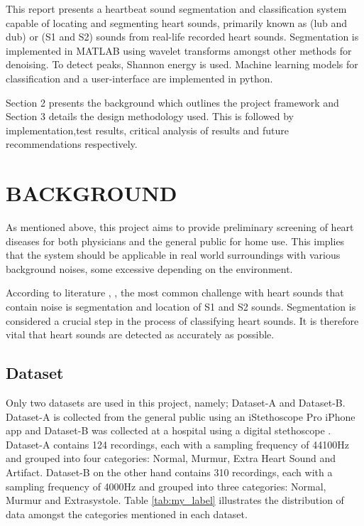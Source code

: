 \documentclass[10pt,twocolumn]{witseiepaper}
\begin{document}
This report presents a heartbeat sound segmentation and classification system capable of locating and segmenting heart sounds, primarily known as (lub and dub) or (S1 and S2) sounds from real-life recorded heart sounds. Segmentation is implemented in MATLAB using wavelet transforms amongst other methods for denoising. To detect peaks, Shannon energy is used. Machine learning models for classification and a user-interface are implemented in python.

Section 2 presents the background which outlines the project framework and Section 3 details the design methodology used. This is followed by implementation,test results, critical analysis of results and future recommendations respectively.

%
\section{BACKGROUND}

As mentioned above, this project aims to provide preliminary screening of heart diseases for both physicians and the general public for home use. This implies that the system should be applicable in real world surroundings with various background noises, some excessive depending on the environment.

According to literature \cite{debbal2008filtering}, \cite{gomes2012classifying}, the most common challenge with heart sounds that contain noise is segmentation and location of S1 and S2 sounds. Segmentation is considered a crucial step in the process of classifying heart sounds. It is therefore vital that heart sounds are detected as accurately as possible.

\subsection{Dataset}
\label{sec:dataset}
Only two datasets are used in this project, namely; Dataset-A and Dataset-B. Dataset-A is collected from the general public using an iStethoscope Pro iPhone app and Dataset-B was collected at a hospital using a digital stethoscope \cite{bentley2011pascal}. Dataset-A contains 124 recordings, each with a sampling frequency of 44100Hz and grouped into four categories: Normal, Murmur, Extra Heart Sound and Artifact. Dataset-B on the other hand contains 310 recordings, each with a sampling frequency of 4000Hz and grouped into three categories: Normal, Murmur and Extrasystole. Table \ref{tab:my_label} illustrates the distribution of data amongst the categories mentioned in each dataset.
\end{document}
